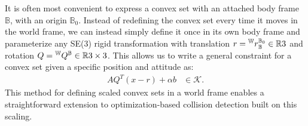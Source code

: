 It is often most convenient to express a convex set with an attached body frame $\mathbb{B}$, with an origin $\mathbb{B}_0$. Instead of redefining the convex set every time it moves in the world frame, we can instead simply define it once in its own body frame and parameterize any SE(3) rigid transformation with translation $r = {}^\mathbb{W} r {}^{\mathbb{B}_0}_\mathbb{B} \in \mathbb{R}{3}$ and rotation $Q = {}^\mathbb{W} Q {}^\mathbb{B} \in \mathbb{R}{3 \times 3}$. This allows us to write a general constraint for a convex set given a specific position and attitude as:
%
\begin{align}
    A Q^T(x - r) + \alpha b &\in \mathcal{K}. \label{eq:se3_standard_form}
\end{align}
%
This method for defining scaled convex sets in a world frame enables a straightforward extension to optimization-based collision detection built on this scaling. 
%
%
